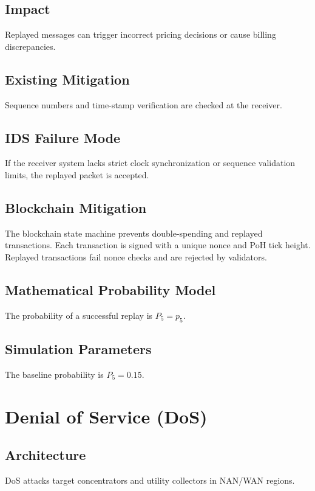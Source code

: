 \documentclass[12pt, oneside, a4paper]{report}
\theoremstyle{definition}
\theoremstyle{remark}
\begin{document}
\subsection{Impact}
Replayed messages can trigger incorrect pricing decisions or cause billing discrepancies.

\subsection{Existing Mitigation}
Sequence numbers and time-stamp verification are checked at the receiver.

\subsection{IDS Failure Mode}
If the receiver system lacks strict clock synchronization or sequence validation limits, the replayed packet is accepted.

\subsection{Blockchain Mitigation}
The blockchain state machine prevents double-spending and replayed transactions. Each transaction is signed with a unique nonce and PoH tick height. Replayed transactions fail nonce checks and are rejected by validators.

\subsection{Mathematical Probability Model}
The probability of a successful replay is $P_5 = p_5$.

\subsection{Simulation Parameters}
The baseline probability is $P_5 = 0.15$.

\bigskip

\section{Denial of Service (DoS)}
\label{sec:tm:dos}

\subsection{Architecture}
DoS attacks target concentrators and utility collectors in NAN/WAN regions.
\end{document}
